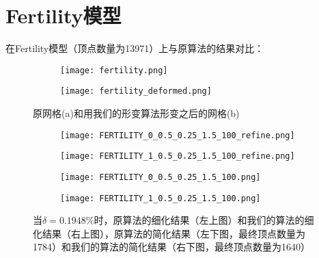 \section{Fertility模型}
在Fertility模型（顶点数量为13971）上与原算法的结果对比：
\begin{figure}[htbp]
  \centering
  \begin{subfigure}[b]{0.4\textwidth}
    \texttt{[image: fertility.png]}
    \end{subfigure}
    \begin{subfigure}[b]{0.4\textwidth}
      \texttt{[image: fertility\_deformed.png]}
    \end{subfigure}
    \caption[fertility形变结果]{原网格(a)和用我们的形变算法形变之后的网格(b)}
    \label{fig:fertility-deform}
\end{figure}

\begin{figure}[htbp]
  \centering
  \begin{subfigure}[b]{0.4\textwidth}
    \texttt{[image: FERTILITY\_0\_0.5\_0.25\_1.5\_100\_refine.png]}
  \end{subfigure}
  \begin{subfigure}[b]{0.4\textwidth}
    \texttt{[image: FERTILITY\_1\_0.5\_0.25\_1.5\_100\_refine.png]}
  \end{subfigure}
  \begin{subfigure}[b]{0.4\textwidth}
    \texttt{[image: FERTILITY\_0\_0.5\_0.25\_1.5\_100.png]}
  \end{subfigure}
  \begin{subfigure}[b]{0.4\textwidth}
    \texttt{[image: FERTILITY\_1\_0.5\_0.25\_1.5\_100.png]}
  \end{subfigure}
  \caption[当$\delta=0.1948\%$时fertility结果对比]{当$\delta=0.1948\%$时，原算法的细化结果（左上图）和我们的算法的细化结果（右上图），原算法的简化结果（左下图，最终顶点数量为1784）和我们的算法的简化结果（右下图，最终顶点数量为1640）}
  \label{fig:fertility-res1}
\end{figure}

